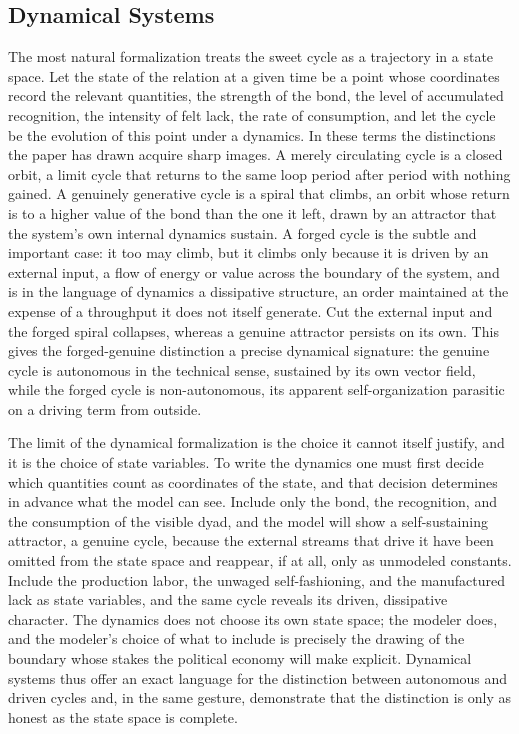 \documentclass[11pt,a4paper]{article}
\begin{document}
\subsection{Dynamical Systems}

The most natural formalization treats the sweet cycle as a trajectory in a state space. Let the state of the relation at a given time be a point whose coordinates record the relevant quantities, the strength of the bond, the level of accumulated recognition, the intensity of felt lack, the rate of consumption, and let the cycle be the evolution of this point under a dynamics. In these terms the distinctions the paper has drawn acquire sharp images. A merely circulating cycle is a closed orbit, a limit cycle that returns to the same loop period after period with nothing gained. A genuinely generative cycle is a spiral that climbs, an orbit whose return is to a higher value of the bond than the one it left, drawn by an attractor that the system's own internal dynamics sustain. A forged cycle is the subtle and important case: it too may climb, but it climbs only because it is driven by an external input, a flow of energy or value across the boundary of the system, and is in the language of dynamics a dissipative structure, an order maintained at the expense of a throughput it does not itself generate. Cut the external input and the forged spiral collapses, whereas a genuine attractor persists on its own. This gives the forged-genuine distinction a precise dynamical signature: the genuine cycle is autonomous in the technical sense, sustained by its own vector field, while the forged cycle is non-autonomous, its apparent self-organization parasitic on a driving term from outside.

The limit of the dynamical formalization is the choice it cannot itself justify, and it is the choice of state variables. To write the dynamics one must first decide which quantities count as coordinates of the state, and that decision determines in advance what the model can see. Include only the bond, the recognition, and the consumption of the visible dyad, and the model will show a self-sustaining attractor, a genuine cycle, because the external streams that drive it have been omitted from the state space and reappear, if at all, only as unmodeled constants. Include the production labor, the unwaged self-fashioning, and the manufactured lack as state variables, and the same cycle reveals its driven, dissipative character. The dynamics does not choose its own state space; the modeler does, and the modeler's choice of what to include is precisely the drawing of the boundary whose stakes the political economy will make explicit. Dynamical systems thus offer an exact language for the distinction between autonomous and driven cycles and, in the same gesture, demonstrate that the distinction is only as honest as the state space is complete.
\end{document}
